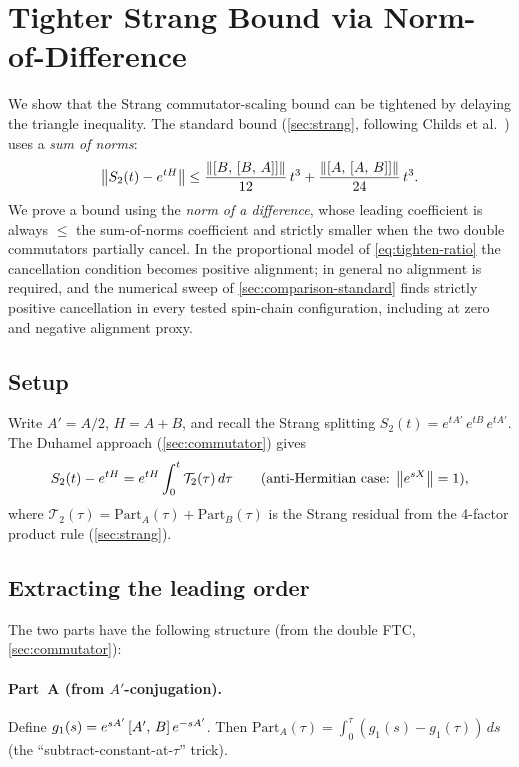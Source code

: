 \section{Tighter Strang Bound via Norm-of-Difference}
\label{apd:tighter}

We show that the Strang commutator-scaling bound can be tightened by
delaying the triangle inequality.
The standard bound
(\cref{sec:strang}, following Childs et al.~\cite{childsTheoryTrotterError2021})
uses a \emph{sum of norms}:
\begin{equation}\label{eq:strang-sum}
  \left\|S_2(t) - e^{tH}\right\|
    \le \frac{\left\|[B,\,[B,\,A]]\right\|}{12}\,t^3
      + \frac{\left\|[A,\,[A,\,B]]\right\|}{24}\,t^3.
\end{equation}
We prove a bound using the \emph{norm of a difference}, whose leading
coefficient is always $\le$ the sum-of-norms coefficient and strictly
smaller when the two double commutators partially cancel.
In the proportional model of \cref{eq:tighten-ratio} the cancellation
condition becomes positive alignment; in general no alignment is required,
and the numerical sweep of \cref{sec:comparison-standard} finds strictly
positive cancellation in every tested spin-chain configuration, including
at zero and negative alignment proxy.

\subsection{Setup}

Write $A' = A/2$, $H = A + B$, and recall the Strang splitting
$S_2(t) = e^{tA'}\,e^{tB}\,e^{tA'}$.
The Duhamel approach (\cref{sec:commutator}) gives
\begin{equation}\label{eq:strang-duhamel}
  S_2(t) - e^{tH} = e^{tH} \int_0^t \mathcal{T}_2(\tau)\,d\tau
  \qquad \text{(anti-Hermitian case: $\left\|e^{sX}\right\| = 1$)},
\end{equation}
where $\mathcal{T}_2(\tau) = \text{Part}_A(\tau) + \text{Part}_B(\tau)$
is the Strang residual from the 4-factor product rule
(\cref{sec:strang}).

\subsection{Extracting the leading order}

The two parts have the following structure
(from the double FTC, \cref{sec:commutator}):

\paragraph{Part~A (from $A'$-conjugation).}
Define $g_1(s) = e^{sA'}\,[A',\,B]\,e^{-sA'}$.
Then $\text{Part}_A(\tau) = \int_0^\tau (g_1(s) - g_1(\tau))\,ds$
(the ``subtract-constant-at-$\tau$'' trick).

